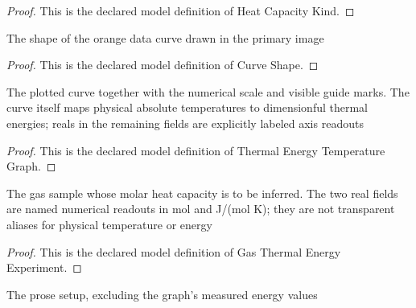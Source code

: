 \begin{proof}
  This is the declared model definition of Heat Capacity Kind.
\end{proof}
\begin{definition}
  \label{def:physics:phyx-mini-0379:phyxminiproblems-problemphyxmini0379-curveshape}
  The shape of the orange data curve drawn in the primary image
\end{definition}
\begin{proof}
  This is the declared model definition of Curve Shape.
\end{proof}
\begin{definition}
  \label{def:physics:phyx-mini-0379:phyxminiproblems-problemphyxmini0379-thermalenergytemperaturegraph}
  The plotted curve together with the numerical scale and visible guide marks. The curve itself maps physical absolute temperatures to dimensionful thermal energies; reals in the remaining fields are explicitly labeled axis readouts
\end{definition}
\begin{proof}
  This is the declared model definition of Thermal Energy Temperature Graph.
\end{proof}
\begin{definition}
  \label{def:physics:phyx-mini-0379:phyxminiproblems-problemphyxmini0379-gasthermalenergyexperiment}
  The gas sample whose molar heat capacity is to be inferred. The two real fields are named numerical readouts in mol and J/(mol K); they are not transparent aliases for physical temperature or energy
\end{definition}
\begin{proof}
  This is the declared model definition of Gas Thermal Energy Experiment.
\end{proof}
\begin{definition}
  \label{def:physics:phyx-mini-0379:phyxminiproblems-problemphyxmini0379-matchesgasthermalenergyscenario}
  The prose setup, excluding the graph's measured energy values
\end{definition}
